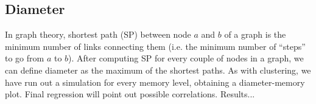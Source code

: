 \subsection{Diameter}
In graph theory, shortest path (SP) between node $a$ and $b$ of a graph is the minimum number of links connecting them (i.e. the minimum number of ``steps'' to go from $a$ to $b$).
After computing SP for every couple of nodes in a graph, we can define diameter as the maximum of the shortest paths.
As with clustering, we have run out a simulation for every memory level, obtaining a diameter-memory plot. Final regression will point out possible correlations.
Results...



